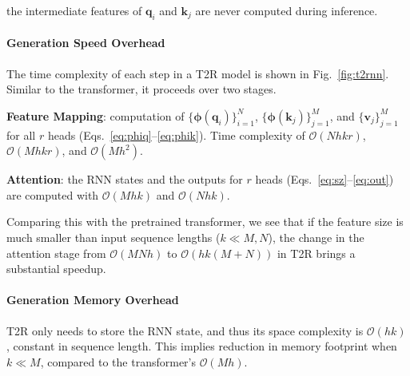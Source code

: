 \documentclass[11pt]{article}
\def\vphi{{\boldsymbol{\phi}}}
\def\vk{{\mathbf{k}}}
\def\vq{{\mathbf{q}}}
\def\vv{{\mathbf{v}}}
\def\gO{{\mathcal{O}}}
\newcommand{\TRNN}{T2R\xspace}
\begin{document}
the intermediate features of $\vq_i$ and $\vk_j$ are never computed during inference. 



\paragraph{Generation Speed Overhead}
The time complexity of each step in a \TRNN model is shown in Fig.\ \ref{fig:t2rnn}.
Similar to the transformer, it proceeds over two stages.
\begin{compactitem}
  \item \textbf{Feature Mapping}: computation of $\{\vphi(\vq_i )\}_{i=1}^N$, $\{\vphi(\vk_j)\}_{j=1}^M$, and $\{\vv_j\}_{j=1}^M$ for all $r$ heads (Eqs.\ \ref{eq:phiq}--\ref{eq:phik}). 
  Time complexity of $\gO( Nhkr)$, $\gO( Mhkr )$, and $\gO( Mh^2)$.
\item \textbf{Attention}: the RNN states and the outputs for $r$ heads (Eqs.\ \ref{eq:sz}--\ref{eq:out}) are computed with $\gO(Mhk)$ and $\gO (Nhk)$.
\end{compactitem}
Comparing this with the pretrained transformer, we see that if the feature size is much smaller than input sequence lengths ($k\ll M,N$), the change in the attention stage from $\gO(MNh)$ to $\gO(hk(M+N))$ in \TRNN brings a substantial speedup.
\paragraph{Generation Memory Overhead}
\TRNN only needs to store the RNN state, and thus its space complexity is $\gO(hk)$, constant in sequence length. 
This implies reduction in memory footprint when $k\ll M$, compared to the transformer's $\gO(Mh)$.
\end{document}
